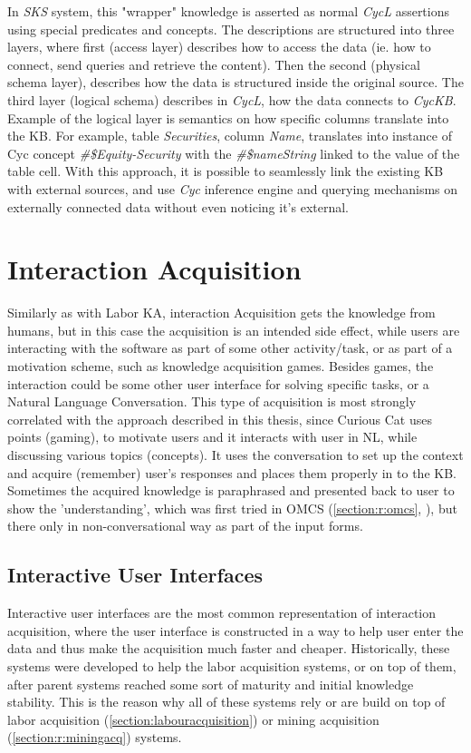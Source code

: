 In \emph{SKS} system, this "wrapper" knowledge is asserted as normal \emph{CycL}
assertions using special predicates and concepts. The descriptions are 
structured into three layers, where first (access layer) describes 
how to access the data (ie. how to connect, send queries and retrieve the 
content). Then the second (physical schema layer), describes how the data is
structured inside the original source. The third layer (logical schema) 
describes in \emph{CycL}, how  the data connects to \emph{CycKB}. Example
of the logical layer is semantics on how specific columns translate into the KB.
For example, table \emph{Securities}, column \emph{Name}, translates into
instance of Cyc concept \emph{\#\$Equity-Security} with the 
\emph{\#\$nameString} linked to the value of the table cell.
With this approach, it is possible to seamlessly link the existing KB with
external sources, and use \emph{Cyc} inference engine and querying mechanisms
on externally connected data without even noticing it's external.


\section{Interaction Acquisition}
\label{section:r:interaction}
Similarly as with Labor KA, interaction Acquisition gets the knowledge from 
humans, but in this case the acquisition is an intended side effect, while
users are interacting with the software as part of some other activity/task, or
as part of a motivation scheme, such as knowledge acquisition games. Besides 
games, the interaction could be some other user interface for solving specific
tasks, or a Natural Language Conversation. This type of acquisition is most 
strongly correlated with the approach described in this thesis, since Curious 
Cat uses points (gaming), to motivate users and it interacts with user in NL, 
while discussing various topics (concepts). It uses the conversation to set up
the context and acquire (remember) user's responses and places them properly in
to the KB. Sometimes the acquired knowledge is paraphrased and presented back to
user to show the 'understanding', which was first tried in OMCS 
(\autoref{section:r:omcs}, \textcite{Singh2002b}), but there only in
non-conversational way as part of the input forms.
 
\subsection{Interactive User Interfaces}
\label{section:r:interactive}
Interactive user interfaces are the most common representation of interaction 
acquisition, where the user interface is constructed in a way to help user enter
the data and thus make the acquisition much faster and cheaper. Historically, 
these systems were developed to help the labor acquisition systems, or on top
of them, after parent systems reached some sort of maturity and initial 
knowledge stability. This is the reason why all of these systems rely or are 
build on top of labor acquisition (\autoref{section:labouracquisition}) or 
mining acquisition (\autoref{section:r:miningacq}) systems.

